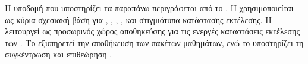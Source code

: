 Η υποδομή που υποστηρίζει τα παραπάνω περιγράφεται από το \texttt{}. Η  χρησιμοποιείται ως κύρια σχεσιακή βάση για , , , ,  και στιγμιότυπα κατάστασης εκτέλεσης. Η  λειτουργεί ως προσωρινός χώρος αποθηκεύσης για τις ενεργές καταστάσεις εκτέλεσης των . Το  εξυπηρετεί την αποθήκευση των  πακέτων μαθημάτων, ενώ το  υποστηρίζει τη συγκέντρωση και επιθεώρηση .


